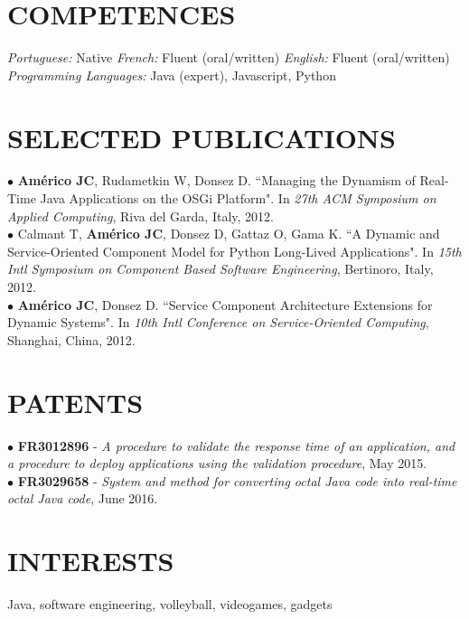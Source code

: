 \documentclass[margin]{res}
\begin{document}
\begin{resume}
		\section{COMPETENCES} {\sl Portuguese:} Native \hfill {\sl French:} Fluent (oral/written) \hfill {\sl English:} Fluent (oral/written)\\
			{\sl Programming Languages:} Java (expert), Javascript, Python\\
		\vspace{-6mm}
		\section{SELECTED PUBLICATIONS} 	
			$\bullet$ {\bf Am\'{e}rico JC}, Rudametkin W, Donsez D. ``Managing the Dynamism of Real-Time Java Applications on the OSGi Platform". In {\sl 27th ACM Symposium on Applied Computing}, Riva del Garda, Italy, 2012. 
			\vspace{1mm}\\
			$\bullet$ Calmant T, {\bf Am\'{e}rico JC}, Donsez D, Gattaz O, Gama K. ``A Dynamic and Service-Oriented Component Model for Python Long-Lived Applications". In {\sl 15th Intl Symposium on Component Based Software Engineering}, Bertinoro, Italy, 2012.
			\vspace{1mm}\\
			$\bullet$ {\bf Am\'{e}rico JC}, Donsez D. ``Service Component Architecture Extensions for Dynamic Systems". In {\sl 10th Intl Conference on Service-Oriented Computing}, Shanghai, China, 2012.
			\vspace{-2mm} 
		\section{PATENTS} 	
			$\bullet$ {\bf FR3012896} - {\sl A procedure to validate the response time of an application, and a procedure to deploy applications using the validation procedure}, May 2015.
			\vspace{1mm}\\
			$\bullet$ {\bf FR3029658} - {\sl System and method for converting octal Java code into real-time octal Java code}, June 2016.
			\vspace{-2mm} 
		\section{INTERESTS} Java, software engineering, volleyball, videogames, gadgets
	\end{resume}
\end{document}
